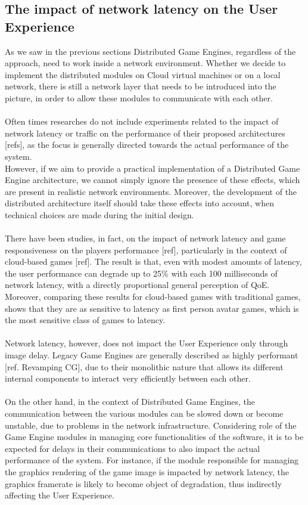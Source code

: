 \subsection{The impact of network latency on the User Experience}
As we saw in the previous sections Distributed Game Engines, regardless of the approach, need to work inside a network environment. Whether we decide to implement the distributed modules on Cloud virtual machines or on a local network, there is still a network layer that needs to be introduced into the picture, in order to allow these modules to communicate with each other. \\ \\
Often times researches do not include experiments related to the impact of network latency or traffic on the performance of their proposed architectures [refs], as the focus is generally directed towards the actual performance of the system. \\
However, if we aim to provide a practical implementation of a Distributed Game Engine architecture, we cannot simply ignore the presence of these effects, which are present in realistic network environments. Moreover, the development of the distributed architecture itself should take these effects into account, when technical choices are made during the initial design. \\ \\
There have been studies, in fact, on the impact of network latency and game responsiveness on the players performance [ref], particularly in the context of cloud-based games [ref]. The result is that, even with modest amounts of latency, the user performance can degrade up to 25\% with each 100 milliseconds of network latency, with a directly proportional general perception of QoE. Moreover, comparing these results for cloud-based games with traditional games, shows that they are as sensitive to latency as first person avatar games, which is the most sensitive class of games to latency. \\ \\
Network latency, however, does not impact the User Experience only through image delay. Legacy Game Engines are generally described as highly performant [ref. Revamping CG], due to their monolithic nature that allows its different internal components to interact very efficiently between each other. \\ \\
On the other hand, in the context of Distributed Game Engines, the communication between the various modules can be slowed down or become unstable, due to problems in the network infrastructure. Considering role of the Game Engine modules in managing core functionalities of the software, it is to be expected for delays in their communications to also impact the actual performance of the system. For instance, if the module responsible for managing the graphics rendering of the game image is impacted by network latency, the graphics framerate is likely to become object of degradation, thus indirectly affecting the User Experience. \\ \\
